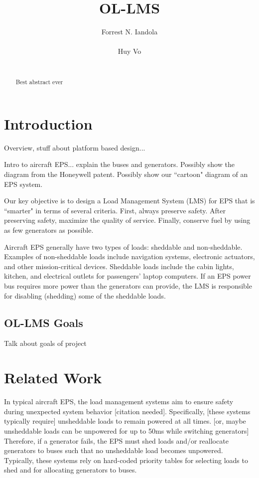 \documentclass{acm_proc_article-sp}
\begin{document}
\title{OL-LMS}

\author{
\alignauthor
Forrest N. Iandola\\
       \\
\alignauthor
Huy Vo\\
       \\
}

\maketitle
\begin{abstract}
Best abstract ever
\end{abstract}


\section{Introduction}
Overview, stuff about platform based design...

Intro to aircraft EPS... explain the buses and generators.
Possibly show the diagram from the Honeywell patent.
Possibly show our ``cartoon" diagram of an EPS system.

Our key objective is to design a Load Management System (LMS) for EPS that is ``smarter" in terms of several criteria.
First, always preserve safety.
After preserving safety, maximize the quality of service.
Finally, conserve fuel by using as few generators as possible.

Aircraft EPS generally have two types of loads: sheddable and non-sheddable.
Examples of non-sheddable loads include navigation systems, electronic actuators, and other mission-critical devices.
Sheddable loads include the cabin lights, kitchen, and electrical outlets for passengers' laptop computers.
If an EPS power bus requires more power than the generators can provide, the LMS is responsible for disabling (shedding) some of the sheddable loads.

\subsection{OL-LMS Goals}
Talk about goals of project

\section{Related Work}
\label{sec:related-work}
In typical aircraft EPS, the load management systems aim to ensure safety during unexpected system behavior [citation needed].
Specifically, [these systems typically require] unsheddable loads to remain powered at all times. [or, maybe unsheddable loads can be unpowered for up to 50ms while switching generators]
Therefore, if a generator fails, the EPS must shed loads and/or reallocate generators to buses such that no unsheddable load becomes unpowered.
Typically, these systems rely on hard-coded priority tables for selecting loads to shed and for allocating generators to buses.
\end{document}
